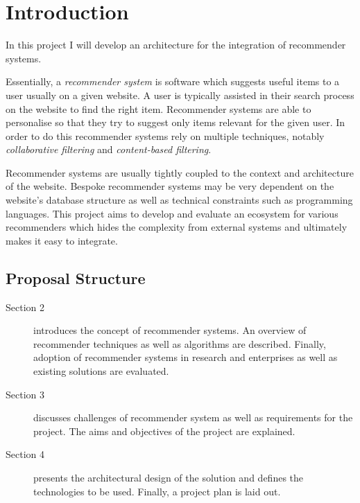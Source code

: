 \chapter{Introduction}

In this project I will develop an architecture for the integration of recommender systems.

Essentially, a \emph{recommender system} is software which suggests useful items to a user usually on a given website. A user is typically assisted in their search process on the website to find the right item. Recommender systems are able to personalise so that they try to suggest only items relevant for the given user. In order to do this recommender systems rely on multiple techniques, notably \emph{collaborative filtering} and \emph{content-based filtering}.

Recommender systems are usually tightly coupled to the context and architecture of the website. Bespoke recommender systems may be very dependent on the website's database structure as well as technical constraints such as programming languages. This project aims to develop and evaluate an ecosystem for various recommenders which hides the complexity from external systems and ultimately makes it easy to integrate. 

\section{Proposal Structure}

\begin{description}
    \item[Section 2] introduces the concept of recommender systems. An overview of recommender techniques as well as algorithms are described. Finally, adoption of recommender systems in research and enterprises as well as existing solutions are evaluated.
    \item[Section 3] discusses challenges of recommender system as well as requirements for the project. The aims and objectives of the project are explained.
    \item[Section 4] presents the architectural design of the solution and defines the technologies to be used. Finally, a project plan is laid out.
\end{description}